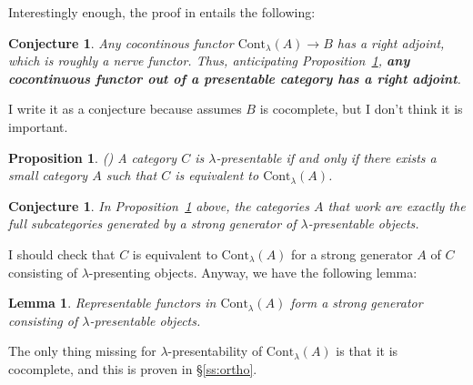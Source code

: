 \documentclass{article}
\newcommand{\Cont}[1]{\text{Cont}_{#1}}
\newtheorem{conjecture}[theorem]{Conjecture}
\newtheorem{proposition}[theorem]{Proposition}
\newtheorem{lemma}[theorem]{Lemma}
\begin{document}
   Interestingly enough, the proof in \cite{adamek_rosicky} entails the following:
   \begin{conjecture}
    Any cocontinous functor $\Cont\lambda(A)\rightarrow B$ has a right adjoint,
    which is roughly a nerve functor.
    Thus, anticipating Proposition~\ref{prop:pres-repr},
    \textbf{any cocontinuous
    functor out of a presentable category has a right adjoint}.
   \end{conjecture}
   I write it as a conjecture because \cite{adamek_rosicky} assumes $B$ is
   cocomplete, but I don't think it is important.
   \begin{proposition}
     \label{prop:pres-repr}
     (\cite[Representation Theorem, 1.46]{adamek_rosicky})
     A category $C$ is $\lambda$-presentable if and only if there exists a small
     category $A$ such that $C$ is equivalent to $\Cont\lambda(A)$.
     \end{proposition}
     \begin{conjecture}
       In Proposition~\ref{prop:pres-repr} above, the categories $A$ that work are exactly the
       full subcategories generated by a strong generator of $\lambda$-presentable objects.
     \end{conjecture}
       I should check that $C$ is equivalent to $\Cont\lambda(A)$ for a
        strong generator $A$ of $C$ consisting of $\lambda$-presenting objects.
        Anyway, we have the following lemma:
     \begin{lemma}
       \label{l:cont-repr-strong-gen}
      Representable functors in $\Cont\lambda(A)$ form a strong generator
      consisting of $\lambda$-presentable objects.
     \end{lemma}
     The only thing missing for $\lambda$-presentability of $\Cont\lambda(A)$ is
     that it is cocomplete, and this is proven in \S\ref{ss:ortho}.
\end{document}
